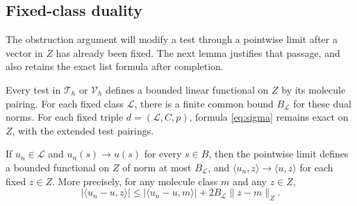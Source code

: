 \subsection{Fixed-class duality}

The obstruction argument will modify a test through a pointwise
limit after a vector in \(Z\) has already been fixed. The next lemma
justifies that passage, and also retains the exact list formula after
completion.

\begin{lemma}\label{lem:duality}
Every test in \(\mathcal T_h\) or \(\mathcal V_h\) defines a bounded
linear functional on \(Z\) by its molecule pairing. For each fixed
class \(\mathcal L\), there is a finite common bound \(B_{\mathcal L}\)
for these dual norms. For each fixed triple \(d=(\mathcal L,C,p)\),
formula \eqref{eq:sigma} remains exact on \(Z\), with the extended
test pairings.

If \(u_n\in\mathcal L\) and \(u_n(s)\to u(s)\) for every \(s\in B\),
then the pointwise limit defines a bounded functional on \(Z\) of
norm at most \(B_{\mathcal L}\), and
\(\langle u_n,z\rangle\to\langle u,z\rangle\) for each fixed
\(z\in Z\). More precisely, for any molecule class \(m\) and any
\(z\in Z\),
\begin{equation}
 |\langle u_n-u,z\rangle|
 \leq|\langle u_n-u,m\rangle|
       +2B_{\mathcal L}\|z-m\|_Z.                            \label{eq:fixed-vector}
\end{equation}
\end{lemma}

